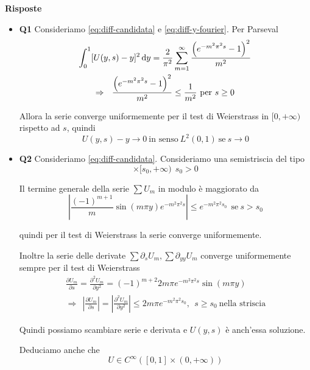 \textbf{Risposte}
\begin{itemize}
\item \textbf{Q1} Consideriamo \eqref{eq:diff-candidata} e \eqref{eq:diff-y-fourier}. Per Parseval
\begin{gather*}
    \int ^{1}_{0}[ U(y,s) -y]^{2} \,\mathrm d y=\frac{2}{\pi ^{2}}\sum\limits ^{\infty }_{m=1}\frac{\left(e^{-m^{2} \pi ^{2} s} -1\right)^{2}}{m^{2}}\\
    \Rightarrow \ \ \frac{\left(e^{-m^{2} \pi ^{2} s} -1\right)^{2}}{m^{2}} \leq \frac{1}{m^{2}} \ \text{per} \ s\geq 0
\end{gather*}

Allora la serie converge uniformemente per il test di Weierstrass in $[ 0,+\infty)$ rispetto ad $s$, quindi
\begin{equation*}
    U(y,s) -y\rightarrow 0\ \text{in senso} \ L^{2}(0,1) \ \text{se} \ s\rightarrow 0
\end{equation*}
\item \textbf{Q2} Consideriamo \eqref{eq:diff-candidata}. Consideriamo una semistriscia del tipo
\begin{equation*}
    [ 0,1] \times [ s_{0},+\infty) \ \ s_{0}  >0
\end{equation*}

Il termine generale della serie $\sum U_{m}$ in modulo è maggiorato da
\begin{equation*}
    \left| \frac{(-1)^{m+1}}{m}\sin(m\pi y) e^{-m^{2} \pi ^{2} s}\right| \leq e^{-m^{2} \pi ^{2} s_{0}} \ \ \text{se} \ s >s_{0}
\end{equation*}

quindi per il test di Weierstrass la serie converge uniformemente.

Inoltre la serie delle derivate $\sum \partial _{s} U_{m},\sum \partial _{yy} U_{m}$ converge uniformemente sempre per il test di Weierstrass
\begin{gather*}
    \frac{\partial U_{m}}{\partial s} =\frac{\partial ^{2} U_{m}}{\partial y^{2}} =(-1)^{m+2} 2m\pi e^{-m^{2} \pi ^{2} s}\sin(m\pi y)\\
    \Rightarrow \ \ \left| \frac{\partial U_{m}}{\partial s}\right| =\left| \frac{\partial ^{2} U_{m}}{\partial y^{2}}\right| \leq 2m \pi e^{-m^{2} \pi ^{2} s_{0}},\ \ s\geq s_{0} \ \text{nella striscia}
\end{gather*}

Quindi possiamo scambiare serie e derivata e $U(y,s)$ è anch'essa soluzione.

Deduciamo anche che
\begin{equation*}
    U\in C^{\infty }([ 0,1] \times (0,+\infty))
\end{equation*}


\end{itemize}
